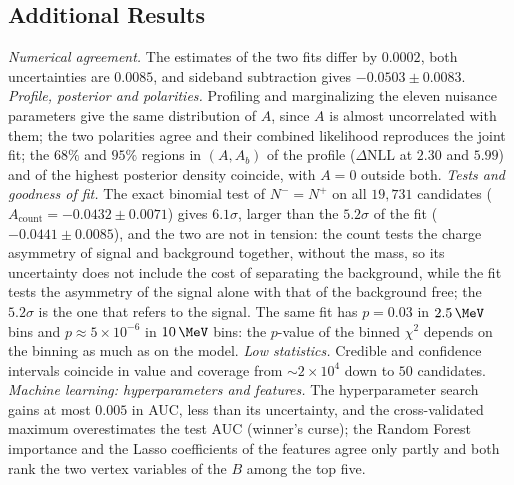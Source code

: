 \subsection{Additional Results}
\emph{Numerical agreement.} The estimates of the two fits differ by $0.0002$, both uncertainties are $0.0085$, and sideband subtraction gives $-0.0503\pm0.0083$.
\emph{Profile, posterior and polarities.} Profiling and marginalizing the eleven nuisance parameters give the same distribution of $A$, since $A$ is almost uncorrelated with them; the two polarities agree and their combined likelihood reproduces the joint fit; the $68\%$ and $95\%$ regions in $(A,A_b)$ of the profile ($\Delta\mathrm{NLL}$ at $2.30$ and $5.99$) and of the highest posterior density coincide, with $A=0$ outside both.
\emph{Tests and goodness of fit.} The exact binomial test of $N^-=N^+$ on all $19{,}731$ candidates ($A_{\mathrm{count}}=-0.0432\pm0.0071$) gives $6.1\sigma$, larger than the $5.2\sigma$ of the fit ($-0.0441\pm0.0085$), and the two are not in tension: the count tests the charge asymmetry of signal and background together, without the mass, so its uncertainty does not include the cost of separating the background, while the fit tests the asymmetry of the signal alone with that of the background free; the $5.2\sigma$ is the one that refers to the signal. The same fit has $p=0.03$ in $2.5\,\MeV$ bins and $p\approx5\times10^{-6}$ in $10\,\MeV$ bins: the $p$-value of the binned $\chi^2$ depends on the binning as much as on the model.
\emph{Low statistics.} Credible and confidence intervals coincide in value and coverage from $\sim2\times10^4$ down to $50$ candidates.
\emph{Machine learning: hyperparameters and features.} The hyperparameter search gains at most $0.005$ in AUC, less than its uncertainty, and the cross-validated maximum overestimates the test AUC (winner's curse); the Random Forest importance and the Lasso coefficients of the features agree only partly and both rank the two vertex variables of the $B$ among the top five.
